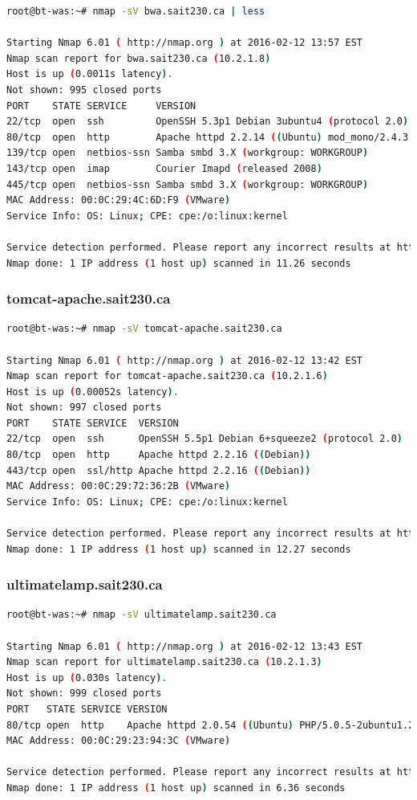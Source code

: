 \documentclass{article}
\begin{document}
\begin{lstlisting}[language=bash]
root@bt-was:~# nmap -sV bwa.sait230.ca | less

Starting Nmap 6.01 ( http://nmap.org ) at 2016-02-12 13:57 EST
Nmap scan report for bwa.sait230.ca (10.2.1.8)
Host is up (0.0011s latency).
Not shown: 995 closed ports
PORT    STATE SERVICE     VERSION
22/tcp  open  ssh         OpenSSH 5.3p1 Debian 3ubuntu4 (protocol 2.0)
80/tcp  open  http        Apache httpd 2.2.14 ((Ubuntu) mod_mono/2.4.3 PHP/5.3.2-1ubuntu4.5 with Suhosin-Patch mod_python/3.3.1 Python/2.6.5 mod_perl/2.0.4 Perl/v5.10.1)
139/tcp open  netbios-ssn Samba smbd 3.X (workgroup: WORKGROUP)
143/tcp open  imap        Courier Imapd (released 2008)
445/tcp open  netbios-ssn Samba smbd 3.X (workgroup: WORKGROUP)
MAC Address: 00:0C:29:4C:6D:F9 (VMware)
Service Info: OS: Linux; CPE: cpe:/o:linux:kernel

Service detection performed. Please report any incorrect results at http://nmap.org/submit/ .
Nmap done: 1 IP address (1 host up) scanned in 11.26 seconds
\end{lstlisting}


\subsubsection{tomcat-apache.sait230.ca}

\begin{lstlisting}[language=bash]
root@bt-was:~# nmap -sV tomcat-apache.sait230.ca

Starting Nmap 6.01 ( http://nmap.org ) at 2016-02-12 13:42 EST
Nmap scan report for tomcat-apache.sait230.ca (10.2.1.6)
Host is up (0.00052s latency).
Not shown: 997 closed ports
PORT    STATE SERVICE  VERSION
22/tcp  open  ssh      OpenSSH 5.5p1 Debian 6+squeeze2 (protocol 2.0)
80/tcp  open  http     Apache httpd 2.2.16 ((Debian))
443/tcp open  ssl/http Apache httpd 2.2.16 ((Debian))
MAC Address: 00:0C:29:72:36:2B (VMware)
Service Info: OS: Linux; CPE: cpe:/o:linux:kernel

Service detection performed. Please report any incorrect results at http://nmap.org/submit/ .
Nmap done: 1 IP address (1 host up) scanned in 12.27 seconds
\end{lstlisting}

\subsubsection{ultimatelamp.sait230.ca}

\begin{lstlisting}[language=bash]
root@bt-was:~# nmap -sV ultimatelamp.sait230.ca

Starting Nmap 6.01 ( http://nmap.org ) at 2016-02-12 13:43 EST
Nmap scan report for ultimatelamp.sait230.ca (10.2.1.3)
Host is up (0.030s latency).
Not shown: 999 closed ports
PORT   STATE SERVICE VERSION
80/tcp open  http    Apache httpd 2.0.54 ((Ubuntu) PHP/5.0.5-2ubuntu1.2)
MAC Address: 00:0C:29:23:94:3C (VMware)

Service detection performed. Please report any incorrect results at http://nmap.org/submit/ .
Nmap done: 1 IP address (1 host up) scanned in 6.36 seconds
\end{lstlisting}
\end{document}
